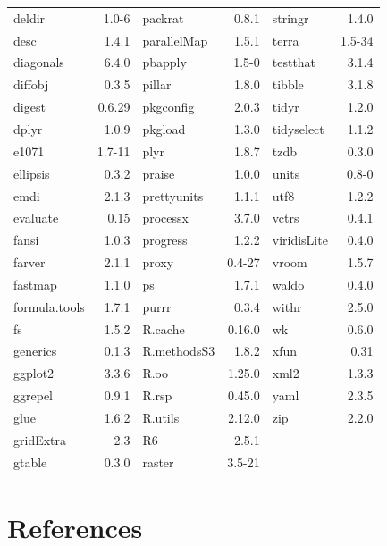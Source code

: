 \begin{longtable}[]{@{}lrlrlr@{}}
deldir & 1.0-6 & packrat & 0.8.1 & stringr & 1.4.0 \\
desc & 1.4.1 & parallelMap & 1.5.1 & terra & 1.5-34 \\
diagonals & 6.4.0 & pbapply & 1.5-0 & testthat & 3.1.4 \\
diffobj & 0.3.5 & pillar & 1.8.0 & tibble & 3.1.8 \\
digest & 0.6.29 & pkgconfig & 2.0.3 & tidyr & 1.2.0 \\
dplyr & 1.0.9 & pkgload & 1.3.0 & tidyselect & 1.1.2 \\
e1071 & 1.7-11 & plyr & 1.8.7 & tzdb & 0.3.0 \\
ellipsis & 0.3.2 & praise & 1.0.0 & units & 0.8-0 \\
emdi & 2.1.3 & prettyunits & 1.1.1 & utf8 & 1.2.2 \\
evaluate & 0.15 & processx & 3.7.0 & vctrs & 0.4.1 \\
fansi & 1.0.3 & progress & 1.2.2 & viridisLite & 0.4.0 \\
farver & 2.1.1 & proxy & 0.4-27 & vroom & 1.5.7 \\
fastmap & 1.1.0 & ps & 1.7.1 & waldo & 0.4.0 \\
formula.tools & 1.7.1 & purrr & 0.3.4 & withr & 2.5.0 \\
fs & 1.5.2 & R.cache & 0.16.0 & wk & 0.6.0 \\
generics & 0.1.3 & R.methodsS3 & 1.8.2 & xfun & 0.31 \\
ggplot2 & 3.3.6 & R.oo & 1.25.0 & xml2 & 1.3.3 \\
ggrepel & 0.9.1 & R.rsp & 0.45.0 & yaml & 2.3.5 \\
glue & 1.6.2 & R.utils & 2.12.0 & zip & 2.2.0 \\
gridExtra & 2.3 & R6 & 2.5.1 & & \\
gtable & 0.3.0 & raster & 3.5-21 & & \\
\end{longtable}

\hypertarget{references}{%
\section*{References}\label{references}}

